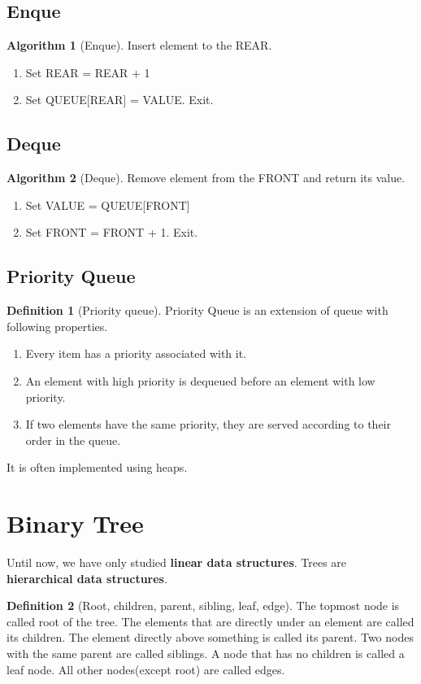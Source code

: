\documentclass[10pt, a4paper]{extarticle}
\theoremstyle{definition}
\newtheorem{alg}{Algorithm}
\newtheorem{defn}{Definition}
\begin{document}
	\subsection{Enque}
	\begin{alg}[Enque]
		Insert element to the REAR.
		\begin{enumerate}
			\item Set REAR = REAR + 1
			\item Set QUEUE[REAR] = VALUE. Exit.
	\end{enumerate}
	\end{alg}
	\subsection{Deque}
	\begin{alg}[Deque]
		Remove element from the FRONT and return its value.
		\begin{enumerate}
			\item Set VALUE = QUEUE[FRONT]
			\item Set FRONT = FRONT + 1. Exit.
	\end{enumerate}
	\end{alg}
	
	\subsection{Priority Queue}
	\begin{defn}[Priority queue]
		Priority Queue is an extension of queue with following properties.
		\begin{enumerate}
			\item Every item has a priority associated with it.
			\item An element with high priority is dequeued before an element with low priority.
			\item If two elements have the same priority, they are served according to their order in the queue.
	\end{enumerate}
	It is often implemented using heaps.
	\end{defn}

	\section{Binary Tree}
	Until  now, we have only studied \textbf{linear data structures}. Trees are \textbf{hierarchical data structures}.
	\begin{defn}[Root, children, parent, sibling, leaf, edge]
		The topmost node is called root of the tree. The elements that are directly under an element are called its children. The element directly above something is called its parent. Two nodes with the same parent are called siblings. A node that has no children is called a leaf node. All other nodes(except root) are called edges.
	\end{defn}
	
\end{document}
